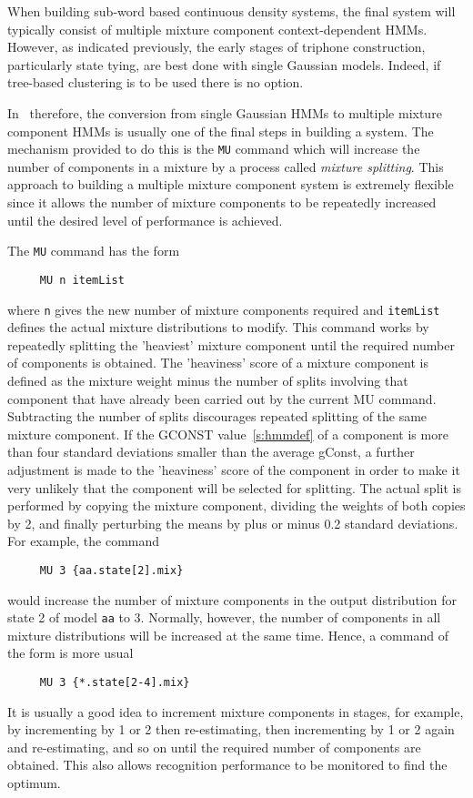 
When building sub-word based continuous density systems, 
the final system will typically consist of multiple mixture component
context-dependent HMMs.  However, as indicated previously, the early
stages of triphone construction, particularly state tying, are best done
with single Gaussian models.  Indeed, if tree-based clustering is to be
used there is no option.

In \HTK\ therefore, the conversion from single Gaussian HMMs to multiple
mixture component HMMs is usually one of the final steps in building
a system.  The mechanism provided to do this is the  \texttt{MU} command
which will increase the number of components in a mixture by 
a process called \textit{mixture splitting}.
This approach to building a multiple
mixture component system is extremely
flexible since it allows the number of mixture components to be repeatedly increased
until the desired level of performance is achieved.

The \texttt{MU} command has the form
\begin{verbatim}
     MU n itemList
\end{verbatim}
where \texttt{n} gives the new number of mixture components required
and \texttt{itemList} defines the actual mixture distributions to
modify.  This command works by repeatedly splitting the 'heaviest'
mixture component until the required number of components is obtained.
The 'heaviness' score of a mixture component is defined as the mixture
weight minus the number of splits involving that component that have
already been carried out by the current MU command. Subtracting the
number of splits discourages repeated splitting of the same mixture
component. If the GCONST value~\ref{s:hmmdef} of a component is more
than four standard deviations smaller than the average gConst, a
further adjustment is made to the 'heaviness' score of the component
in order to make it very unlikely that the component will be selected
for splitting. The actual split is performed by copying the mixture
component, dividing the weights of both copies by 2, and finally
perturbing the means by plus or minus 0.2 standard deviations.  For
example, the command
\begin{verbatim}
     MU 3 {aa.state[2].mix}
\end{verbatim}
would increase the number of mixture components in the output distribution
for state 2 of model \texttt{aa} to 3.   Normally, however,  the number of
components in all mixture distributions will be increased at the same time.
Hence, a command of the form is more usual
\begin{verbatim}
     MU 3 {*.state[2-4].mix}
\end{verbatim}
It is usually a good idea to increment mixture components in
stages, for example, by incrementing by 1 or 2 then re-estimating, then
incrementing by 1 or 2 again and re-estimating, and so on until the
required number of components are obtained.  This also allows recognition performance
to be monitored to find the optimum.

